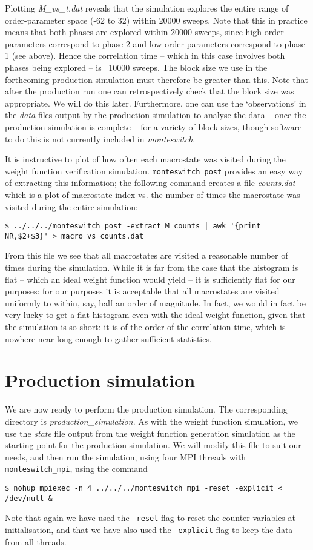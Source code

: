 \documentclass{report}
\begin{document}
Plotting \emph{M\_vs\_t.dat} reveals that the simulation explores the entire range of order-parameter space (-62 to 32) within 20000 sweeps. Note that this
in practice means that both phases are explored within 20000 sweeps, since high order parameters correspond to phase 2 and low order parameters correspond
to phase 1 (see above). Hence the correlation time -- which in this case involves both phases being explored -- is ~10000 sweeps. The 
block size we use in the
forthcoming production simulation must therefore be greater than this. Note that after the production run one can retrospectively check that the
block size was appropriate. We will do this later. Furthermore, one can use the `observations' in the \emph{data} files output by the production simulation to
analyse the data -- once the production simulation is complete -- for a variety of block sizes, though software to do this is not currently included in
\emph{monteswitch}.

It is instructive to plot of how often each macrostate was visited during the weight function verification simulation. \texttt{monteswitch\_post}
provides an easy way of extracting this information; the following command creates a file \emph{counts.dat} which is a plot of macrostate index vs. the
number of times the  macrostate was visited during the entire simulation:
\begin{verbatim}
$ ../../../monteswitch_post -extract_M_counts | awk '{print 
NR,$2+$3}' > macro_vs_counts.dat
\end{verbatim}
From this file we see that all macrostates are visited a reasonable number of times during the simulation. While it is far from the case that the
histogram is flat -- which an ideal weight function would yield -- it is sufficiently flat for our purposes: for our purposes it is acceptable that
all macrostates are visited uniformly to within, say, half an order of magnitude. In fact, we would in fact be very lucky to get a flat histogram
even with the ideal weight function, given that the simulation is so short: it is of the order of the correlation time, which is nowhere near long
enough to gather sufficient statistics.


\section{Production simulation}
We are now ready to perform the production simulation. The corresponding directory is \emph{production\_simulation}.
As with the weight function simulation, we use the \emph{state} file output from the weight function generation simulation as the starting point
for the production simulation. We will modify this file to suit our needs, and then run the simulation, using four MPI threads with \texttt{monteswitch\_mpi},
using the command
\begin{verbatim}
$ nohup mpiexec -n 4 ../../../monteswitch_mpi -reset -explicit <
/dev/null &
\end{verbatim}
Note that again we have used the \texttt{-reset} flag to reset the counter variables at initialisation, and that we have also used the \texttt{-explicit}
flag to keep the data from all threads.
\end{document}
